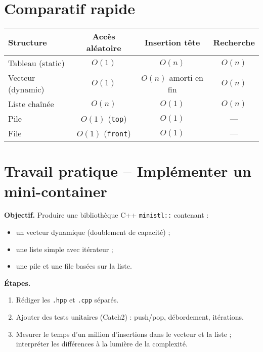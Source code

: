 \section{Comparatif rapide}

\begin{center}\small
\begin{tabular}{lccc}
\hline
\textbf{Structure} & \textbf{Accès aléatoire} & \textbf{Insertion tête} & \textbf{Recherche}\\
\hline
Tableau (static) & $O(1)$ & $O(n)$ & $O(n)$ \\
Vecteur (dynamic) & $O(1)$ & $O(n)$ amorti en fin & $O(n)$ \\
Liste chaînée & $O(n)$ & $O(1)$ & $O(n)$ \\
Pile & $O(1)$ (\lstinline|top|) & $O(1)$ & — \\
File & $O(1)$ (\lstinline|front|) & $O(1)$ & — \\
\hline
\end{tabular}
\end{center}

\section*{Travail pratique – Implémenter un mini-container}

\begin{tp}
\textbf{Objectif.}  Produire une bibliothèque C++ \lstinline|ministl::|
contenant :
\begin{itemize}
  \item un vecteur dynamique (doublement de capacité) ;
  \item une liste simple avec itérateur ;
  \item une pile et une file basées sur la liste.
\end{itemize}
\textbf{Étapes.}
\begin{enumerate}
  \item Rédiger les \lstinline|.hpp| et \lstinline|.cpp| séparés.
  \item Ajouter des tests unitaires (Catch2) : push/pop, débordement, itérations.
  \item Mesurer le temps d’un million d’insertions dans le vecteur et la liste ;
        interpréter les différences à la lumière de la complexité.
\end{enumerate}
\end{tp}

